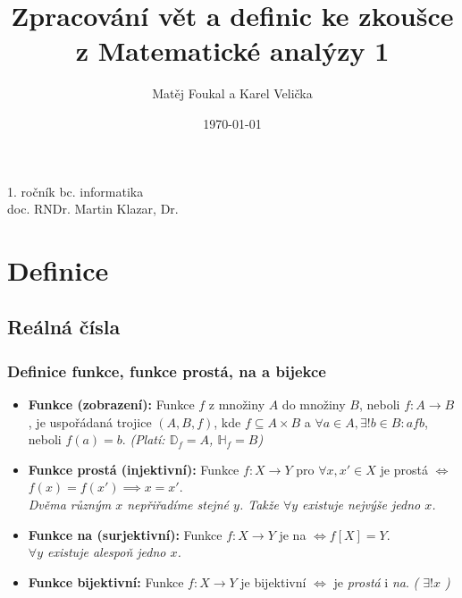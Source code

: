 \documentclass[10pt,a4paper]{article}
\title{Zpracování vět a definic ke zkoušce z Matematické analýzy 1}
\date{\today}
\author{Matěj Foukal a Karel Velička}
\begin{document}
\maketitle

\begin{center}
    1. ročník bc. informatika\\ doc. RNDr. Martin Klazar, Dr.
\end{center}


\tableofcontents

\newpage


\section{Definice}

\subsection{Reálná čísla}

\subsubsection{Definice funkce, funkce prostá, na a bijekce}

\begin{itemize}
    \item \textbf{Funkce (zobrazení):} Funkce $f$ z množiny $A$ do množiny $B$, neboli $f:A\to B$, je uspořádaná trojice $(A, B, f)$, kde $f\subseteq A\times B$ a  \(\forall a \in A, \exists ! b\in B: afb\), neboli $f(a) = b$. \textit{(Platí: $\mathbb{D}_f = A$, $\mathbb{H}_f = B$)}
    \item \textbf{Funkce prostá (injektivní):} Funkce $f: X\to Y$ pro $\forall x,x' \in X$ je prostá $\iff$ $f(x) = f(x') \implies  x = x'$. \\ \textit{Dvěma různým $x$ nepřiřadíme stejné $y$. Takže $\forall y$ existuje nejvýše jedno $x$.}
    \item \textbf{Funkce na (surjektivní):} Funkce $f: X\to Y$ je na $\iff f[X] = Y$. \\ \textit{$\forall y$ existuje alespoň jedno $x$.}
    \item \textbf{Funkce bijektivní:} Funkce $f: X\to Y$ je bijektivní $\iff$ je \textit{prostá} i \textit{na}. \textit{( $\exists !x$ )}
\end{itemize}
\end{document}
